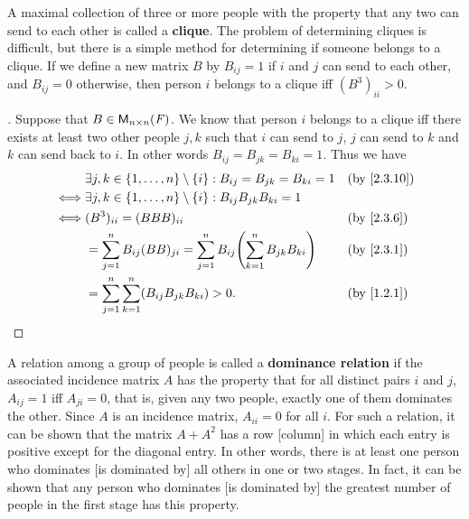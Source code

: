 \begin{eg}\label{2.3.10}
	A maximal collection of three or more people with the property that any two can send to each other is called a \textbf{clique}.
	The problem of determining cliques is difficult, but there is a simple method for determining if someone belongs to a clique.
	If we define a new matrix \(B\) by \(B_{i j} = 1\) if \(i\) and \(j\) can send to each other, and \(B_{i j} = 0\) otherwise, then person \(i\) belongs to a clique iff \((B^3)_{i i} > 0\).
\end{eg}

\begin{proof}[]
	Suppose that \(B \in \mathsf{M}_{{n} \times n}({\mathit{F}})\).
	We know that person \(i\) belongs to a clique iff there exists at least two other people \(j, k\) such that \(i\) can send to \(j\), \(j\) can send to \(k\) and \(k\) can send back to \(i\).
	In other words \(B_{i j} = B_{j k} = B_{k i} = 1\).
	Thus we have
	\begin{align*}
		     & \exists j, k \in \set{1, \dots, n} \setminus \set{i} : B_{i j} = B_{j k} = B_{k i} = 1           &  & \by{2.3.10} \\
		\iff & \exists j, k \in \set{1, \dots, n} \setminus \set{i} : B_{i j} B_{j k} B_{k i} = 1                                \\
		\iff & (B^3)_{i i} = (BBB)_{i i}                                                                        &  & \by{2.3.6}  \\
		     & = \sum_{j = 1}^n B_{i j} (BB)_{j i} = \sum_{j = 1}^n B_{i j} \pa{\sum_{k = 1}^n B_{j k} B_{k i}} &  & \by{2.3.1}  \\
		     & = \sum_{j = 1}^n \sum_{k = 1}^n (B_{i j} B_{j k} B_{k i}) > 0.                                   &  & \by{1.2.1}
	\end{align*}
\end{proof}

\begin{eg}\label{2.3.11}
	A relation among a group of people is called a \textbf{dominance relation} if the associated incidence matrix \(A\) has the property that for all distinct pairs \(i\) and \(j\), \(A_{i j} = 1\) iff \(A_{j i} = 0\), that is, given any two people, exactly one of them dominates the other.
	Since \(A\) is an incidence matrix, \(A_{i i} = 0\) for all \(i\).
	For such a relation, it can be shown that the matrix \(A + A^2\) has a row [column] in which each entry is positive except for the diagonal entry.
	In other words, there is at least one person who dominates [is dominated by] all others in one or two stages.
	In fact, it can be shown that any person who dominates [is dominated by] the greatest number of people in the first stage has this property.
\end{eg}

